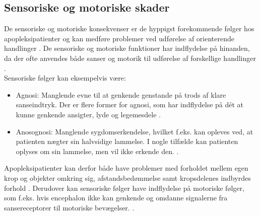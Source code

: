 \subsection{Sensoriske og motoriske skader} %
De sensoriske og motoriske konsekvenser er de hyppigst forekommende følger hos apopleksipatienter og kan medføre problemer ved udførelse af orienterende handlinger \cite{Kruuse2015a,DSfA2009}.  De sensoriske og motoriske funktioner har indflydelse på hinanden, da der ofte anvendes både sanser og motorik til udførelse af forskellige handlinger \cite{Nichols1997}.  \\
\noindent Sensoriske følger kan eksempelvis være:
\begin{itemize}
  \item Agnosi: Manglende evne til at genkende genstande på trods af klare sanseindtryk. Der er flere former for agnosi, som har indflydelse på dét at kunne genkende ansigter, lyde og legemesdele \cite{Redaktionen2015}. 
 \item Anosognosi: Manglende sygdomserkendelse, hvilket f.eks. kan opleves ved, at patienten nægter sin halvsidige lammelse. I nogle tilfælde kan patienten oplyses om sin lammelse, men vil ikke erkende den. \cite{Pedersen1999}.
\end{itemize}
Apopleksipatienter kan derfor både have problemer med forholdet mellem egen krop og objekter omkring sig, afstandsbedømmelse samt kropsdelenes indbyrdes forhold \cite{Kruuse2015a,DSfA2009}. Derudover kan sensoriske følger have indflydelse på motoriske følger, som f.eks. hvis encephalon ikke kan genkende og omdanne signalerne fra sansereceptorer til motoriske bevægelser. \cite{Nichols1997,Martini2012}. \\
